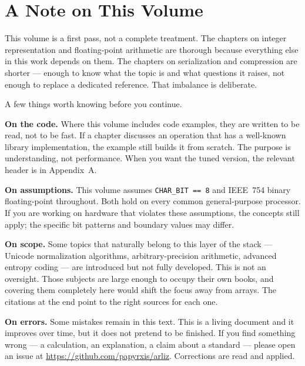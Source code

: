
\chapter*{A Note on This Volume}

This volume is a first pass, not a complete treatment. The chapters on
integer representation and floating-point arithmetic are thorough because
everything else in this work depends on them. The chapters on serialization
and compression are shorter --- enough to know what the topic is and what
questions it raises, not enough to replace a dedicated reference. That
imbalance is deliberate.

A few things worth knowing before you continue.

\medskip

\noindent\textbf{On the code.}\quad
Where this volume includes code examples, they are written to be read, not
to be fast. If a chapter discusses an operation that has a well-known
library implementation, the example still builds it from scratch. The
purpose is understanding, not performance. When you want the tuned version,
the relevant header is in Appendix~A.

\medskip

\noindent\textbf{On assumptions.}\quad
This volume assumes \texttt{CHAR\_BIT == 8} and IEEE~754 binary
floating-point throughout. Both hold on every common general-purpose
processor. If you are working on hardware that violates these assumptions,
the concepts still apply; the specific bit patterns and boundary values
may differ.

\medskip

\noindent\textbf{On scope.}\quad
Some topics that naturally belong to this layer of the stack --- Unicode
normalization algorithms, arbitrary-precision arithmetic, advanced entropy
coding --- are introduced but not fully developed. This is not an oversight.
Those subjects are large enough to occupy their own books, and covering
them completely here would shift the focus away from arrays. The citations
at the end point to the right sources for each one.

\medskip

\noindent\textbf{On errors.}\quad
Some mistakes remain in this text. This is a living document and it
improves over time, but it does not pretend to be finished. If you find
something wrong --- a calculation, an explanation, a claim about a
standard --- please open an issue at
\url{https://github.com/papyrxis/arliz}. Corrections are read and
applied.

